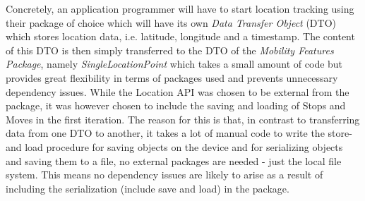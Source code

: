 Concretely, an application programmer will have to start location tracking using their package of choice which will have its own \textit{Data Transfer Object} (DTO) which stores location data, i.e. latitude, longitude and a timestamp. The content of this DTO is then simply transferred to the DTO of the \textit{Mobility Features Package}, namely \textit{SingleLocationPoint} which takes a small amount of code but provides great flexibility in terms of packages used and prevents unnecessary dependency issues. While the Location API was chosen to be external from the package, it was however chosen to include the saving and loading of Stops and Moves in the first iteration. The reason for this is that, in contrast to transferring data from one DTO to another, it takes a lot of manual code to write the store- and load procedure for saving objects on the device and for serializing objects and saving them to a file, no external packages are needed - just the local file system. This means no dependency issues are likely to arise as a result of including the serialization (include save and load) in the package.
